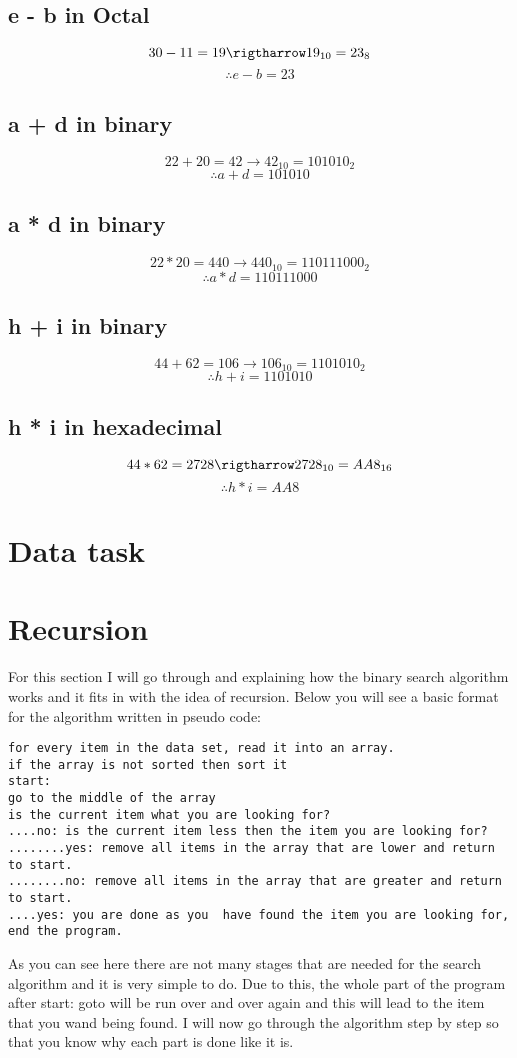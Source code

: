 \documentclass{article}
\begin{document}
\subsection{e - b in Octal}
\[
	30 - 11 = 19 \rigtharrow 19_{10} = 23_{8}
\]
\[
	\therefore e - b = 23
\]
\subsection{a + d in binary}
\[
	22 + 20 = 42 \rightarrow 42_{10} = 101010_{2}
\]
\[
	\therefore a + d = 101010
\]
\subsection{a * d in binary}
\[
	22 * 20 = 440 \rightarrow 440_{10} = 110111000_{2}
\]
\[
	\therefore a * d = 110111000
\]
\subsection{h + i in binary}
\[
	44 + 62 = 106 \rightarrow 106_{10} = 1101010_{2}
\]
\[
	\therefore h + i = 1101010
\]
\subsection{h * i in hexadecimal}
\[
	44 * 62 = 2728 \rigtharrow 2728_{10} = AA8_{16}
\]
\[
	\therefore h * i = AA8
\]
\section{Data task}

\section{Recursion}
For this section I will go through and explaining how the binary search algorithm works and it fits in with the idea of recursion. Below you will see a basic format for the algorithm written in pseudo code:

\begin{verbatim}
for every item in the data set, read it into an array. 
if the array is not sorted then sort it
start:
go to the middle of the array 
is the current item what you are looking for?
....no: is the current item less then the item you are looking for?
........yes: remove all items in the array that are lower and return to start.
........no: remove all items in the array that are greater and return to start.
....yes: you are done as you  have found the item you are looking for, end the program. 
\end{verbatim}
As you can see here there are not many stages that are needed for the search algorithm and it is very simple to do. Due to this, the whole part of the program after start: goto will be run over and over again and this will lead to the item that you wand being found. I will now go through the algorithm step by step so that you know why each part is done like it is. 
\end{document}

